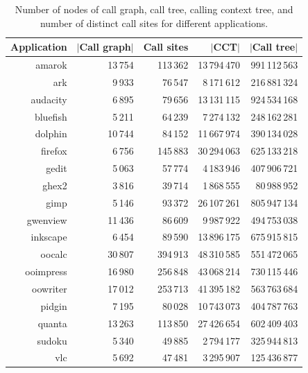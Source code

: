 \documentclass{sigplanconf}
\begin{document}
\begin{table}[t]
\caption{Number of nodes of call graph, call tree, calling context tree, and number of distinct call sites for different applications.}
\centering
\begin{small}
\begin{tabular}{r r r r r}
\hline\hline
Application & $|$Call graph$|$ & Call sites & $|$CCT$|$ & $|$Call tree$|$\\
\hline
amarok & 13\,754 & 113\,362 & 13\,794\,470 & 991\,112\,563 \\
ark & 9\,933 & 76\,547 & 8\,171\,612 & 216\,881\,324 \\
audacity & 6\,895 & 79\,656 & 13\,131\,115 & 924\,534\,168 \\
bluefish & 5\,211 & 64\,239 & 7\,274\,132 & 248\,162\,281 \\
dolphin & 10\,744 & 84\,152 & 11\,667\,974 & 390\,134\,028 \\
firefox & 6\,756 & 145\,883 & 30\,294\,063 & 625\,133\,218 \\
gedit & 5\,063 & 57\,774 & 4\,183\,946 & 407\,906\,721 \\
ghex2 & 3\,816 & 39\,714 & 1\,868\,555 & 80\,988\,952 \\
gimp & 5\,146 & 93\,372 & 26\,107\,261 & 805\,947\,134 \\
gwenview & 11\,436 & 86\,609 & 9\,987\,922 & 494\,753\,038 \\
inkscape & 6\,454 & 89\,590 & 13\,896\,175 & 675\,915\,815 \\
oocalc & 30\,807 & 394\,913 & 48\,310\,585 & 551\,472\,065 \\
ooimpress & 16\,980 & 256\,848 & 43\,068\,214 & 730\,115\,446 \\
oowriter & 17\,012 & 253\,713 & 41\,395\,182 & 563\,763\,684 \\
pidgin & 7\,195 & 80\,028 & 10\,743\,073 & 404\,787\,763 \\
quanta & 13\,263 & 113\,850 & 27\,426\,654 & 602\,409\,403 \\
sudoku & 5\,340 & 49\,885 & 2\,794\,177 & 325\,944\,813 \\
vlc & 5\,692 & 47\,481 & 3\,295\,907 & 125\,436\,877 \\
\hline
\end{tabular}
\end{small}
\label{tab:CCTsize}
\end{table}
\end{document}
